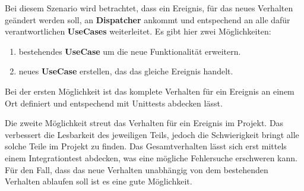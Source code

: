 
    Bei diesem Szenario wird betrachtet, dass ein Ereignis, für das neues Verhalten geändert werden soll, an \textbf{Dispatcher} ankommt und entspechend an alle dafür 
    verantwortlichen \textbf{UseCases} weiterleitet. 
    Es gibt hier zwei Möglichkeiten:
    \begin{enumerate}
        \item bestehendes \textbf{UseCase} um die neue Funktionalität erweitern.
        \item neues \textbf{UseCase}  erstellen, das das gleiche Ereignis handelt.
    \end{enumerate}

    Bei der ersten Möglichkeit ist das komplete Verhalten für ein Ereignis an einem Ort definiert und entspechend mit Unittests abdecken lässt.

    Die zweite Möglichkeit streut das Verhalten für ein Ereignis im Projekt. Das verbessert die Lesbarkeit des jeweiligen Teils,
    jedoch die Schwierigkeit bringt alle solche Teile im Projekt zu finden. Das Gesamtverhalten lässt sich erst mittels
    einem Integrationtest abdecken, was eine mögliche Fehlersuche erschweren kann. 
    Für den Fall, dass das neue Verhalten unabhängig von dem bestehenden Verhalten ablaufen soll ist es eine gute Möglichkeit.